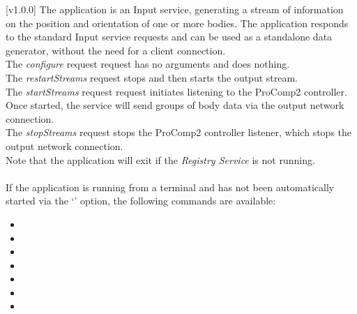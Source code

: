 [v1.0.0]
The  application is an Input service,
generating a stream of information on the position and orientation of one or more bodies.
The application responds to the standard Input service requests and can be used as a
standalone data generator, without the need for a client connection.\\

The \emph{configure} request request has no arguments and does nothing.\\

The \emph{restartStreams} request stops and then starts the output stream.\\

The \emph{startStreams} request request initiates listening to the ProComp2 controller.
Once started, the service will send groups of body data via the output \yarp{} network
connection.\\

The \emph{stopStreams} request stops the ProComp2 controller listener, which stops the
output \yarp{} network connection.\\ 

Note that the application will exit if the \emph{Registry Service} is not running.\\

\insertAppParameters{}
\insertTagDescription{\PCtwoI}
\insertInputServiceComment{}\\

If the application is running from a terminal and has not been automatically started via
the `' option, the following commands are available:
\begin{itemize}
\item{}
\item\exSp{}
\item\exSp{}
\item\exSp{}
\item\exSp{}
\item\exSp{}
\item\exSp{}
\end{itemize}
\primaryEnd{}
